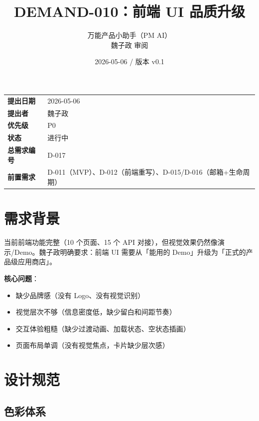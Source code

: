 \documentclass[11pt,a4paper]{article}
\title{\textbf{DEMAND-010：前端 UI 品质升级}}
\author{万能产品小助手（PM AI）\\魏子政 审阅}
\date{2026-05-06 / 版本 v0.1}
\begin{document}
\maketitle

\begin{center}
\begin{tabular}{>{\bfseries}p{3cm} p{10cm}}
\toprule
提出日期 & 2026-05-06 \\
提出者 & 魏子政 \\
优先级 & \textcolor{danger}{P0} \\
状态 & \textcolor{progress}{进行中} \\
总需求编号 & D-017 \\
前置需求 & D-011（MVP）、D-012（前端重写）、D-015/D-016（邮箱+生命周期） \\
\bottomrule
\end{tabular}
\end{center}

\vspace{1em}

\section{需求背景}

当前前端功能完整（10 个页面、15 个 API 对接），但视觉效果仍然像演示/Demo。魏子政明确要求：前端 UI 需要从「能用的 Demo」升级为「正式的产品级应用商店」。

\textbf{核心问题}：
\begin{itemize}[nosep]
  \item 缺少品牌感（没有 Logo、没有视觉识别）
  \item 视觉层次不够（信息密度低，缺少留白和间距节奏）
  \item 交互体验粗糙（缺少过渡动画、加载状态、空状态插画）
  \item 页面布局单调（没有视觉焦点，卡片缺少层次感）
\end{itemize}

\section{设计规范}

\subsection{色彩体系}
\end{document}
